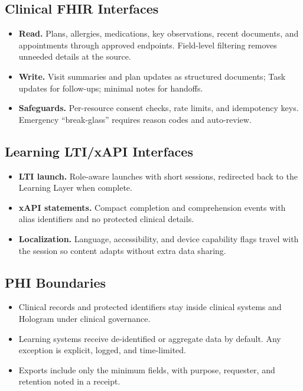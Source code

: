 \documentclass[12pt]{article}
\begin{document}
\subsection*{Clinical FHIR Interfaces}
\begin{itemize}[leftmargin=*]
  \item \textbf{Read.} Plans, allergies, medications, key observations, recent documents, and appointments through approved endpoints. Field-level filtering removes unneeded details at the source.
  \item \textbf{Write.} Visit summaries and plan updates as structured documents; Task updates for follow-ups; minimal notes for handoffs.
  \item \textbf{Safeguards.} Per-resource consent checks, rate limits, and idempotency keys. Emergency “break-glass” requires reason codes and auto-review.
\end{itemize}

\subsection*{Learning LTI/xAPI Interfaces}
\begin{itemize}[leftmargin=*]
  \item \textbf{LTI launch.} Role-aware launches with short sessions, redirected back to the Learning Layer when complete.
  \item \textbf{xAPI statements.} Compact completion and comprehension events with alias identifiers and no protected clinical details.
  \item \textbf{Localization.} Language, accessibility, and device capability flags travel with the session so content adapts without extra data sharing.
\end{itemize}

\subsection*{PHI Boundaries}
\begin{itemize}[leftmargin=*]
  \item Clinical records and protected identifiers stay inside clinical systems and Hologram under clinical governance.
  \item Learning systems receive de-identified or aggregate data by default. Any exception is explicit, logged, and time-limited.
  \item Exports include only the minimum fields, with purpose, requester, and retention noted in a receipt.
\end{itemize}
\end{document}
